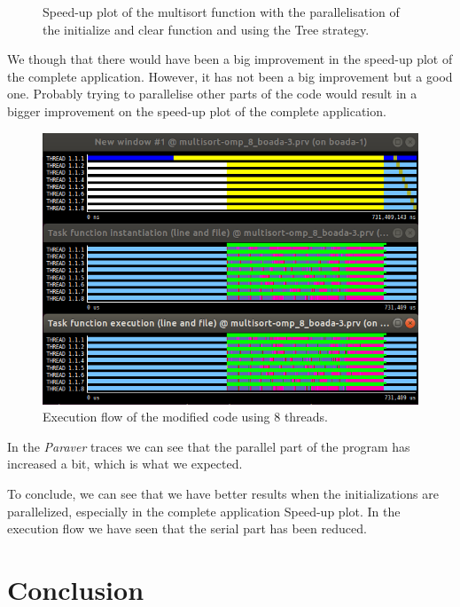 \documentclass[12pt, a4paper]{article}
\begin{document}
\begin{figure}[H]
\begin{minipage}[b]{0.4\linewidth}
  \caption{Speed-up plot of the multisort function with the parallelisation of the initialize and clear function and using the Tree strategy.}
  \label{fig:mandel-omp-10000-strong-21-speedup}
\end{minipage}
\end{figure}

We though that there would have been a big improvement in the speed-up plot of the complete application. However, it has not been a big improvement but a good one. Probably trying to parallelise other parts of the code would result in a bigger improvement on the speed-up plot of the complete application.

\begin{figure}[H]
	\centering
	\includegraphics[scale=0.45]{./images/S2/OP2_paraver}
	
	\label{fig_ann:S2_scalability_op2}
	\caption{Execution flow of the modified code using 8 threads.}
\end{figure}

In the \textit{Paraver} traces we can see that the parallel part of the program has increased a bit, which is what we expected.

To conclude, we can see that we have better results when the initializations are parallelized, especially in the complete application Speed-up plot. In the execution flow we have seen that the serial part has been reduced.

\section{Conclusion}
\end{document}

